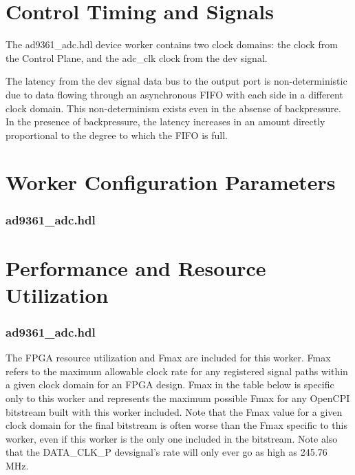 \documentclass{article}
\def\comp{ad9361\_adc}
\edef\ecomp{ad9361_adc}
\begin{document}
\section*{Control Timing and Signals}
The \comp{}.hdl device worker contains two clock domains: the clock from the Control Plane, and the adc\_clk clock from the dev signal.\par\bigskip
\noindent The latency from the dev signal data bus to the output port is non-deterministic due to data flowing through an asynchronous FIFO with each side in a different clock domain. This non-determinism exists even in the absense of backpressure. In the presence of backpressure, the latency increases in an amount directly proportional to the degree to which the FIFO is full.

\section*{Worker Configuration Parameters}
\subsubsection*{\comp.hdl}
%
\section*{Performance and Resource Utilization}
\subsubsection*{\comp.hdl}
The FPGA resource utilization and Fmax are included for this worker. Fmax refers to the maximum allowable clock rate for any registered signal paths within a given clock domain for an FPGA design. Fmax in the table below is specific only to this worker and represents the maximum possible Fmax for any OpenCPI bitstream built with this worker included. Note that the Fmax value for a given clock domain for the final bitstream is often worse than the Fmax specific to this worker, even if this worker is the only one included in the bitstream. Note also that the DATA\_CLK\_P devsignal's rate will only ever go as high as 245.76 MHz\cite{adi_ug570}. \\ \\

%


\end{document}
